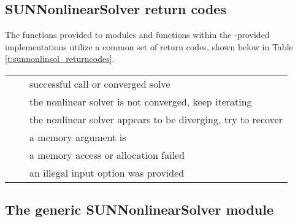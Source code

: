 \subsection{SUNNonlinearSolver return codes}
\label{ss:sunnonlinsol_returncodes}

The functions provided to {\sunnonlinsol} modules and functions within
the {\sundials}-provided {\sunnonlinsol} implementations utilize a
common set of return codes, shown below in Table \ref{t:sunnonlinsol_returncodes}.

\newlength{\ColumnOneA}
\newlength{\ColumnTwoA}
\newlength{\ColumnThreeA}
\setlength{\ColumnThreeA}{\textwidth}
\addtolength{\ColumnThreeA}{-0.5in}
\addtolength{\ColumnThreeA}{-\ColumnOneA}
\addtolength{\ColumnThreeA}{-\ColumnTwoA}

\label{t:sunnonlinsol_returncodes}
\begin{xtabular}{|p{\ColumnOneA}|p{\ColumnTwoA}|p{\ColumnThreeA}|}
     &   & successful call or converged solve
\\[1mm]
    &   & the nonlinear solver is not
                                      converged, keep iterating 
\\[1mm]
 &   & the nonlinear solver appears to
                                       be diverging, try to recover
\\[1mm]
   &  & a memory argument is 
\\[1mm]
   &  & a memory access or allocation failed
\\[1mm]
  &  & an illegal input option was provided
\\
\end{xtabular}
\bigskip


\subsection{The generic SUNNonlinearSolver module}
\label{ss:sunnonlinsol_generic}

